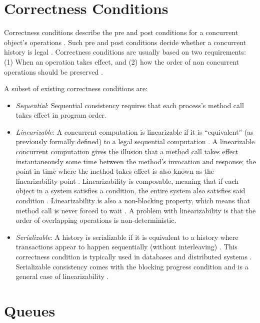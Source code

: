 \section{Correctness Conditions}

Correctness conditions describe the pre and post conditions for a concurrent object's operations \cite{herlihy2020art}. Such pre and post conditions decide whether a concurrent history is legal \cite{herlihy1990linearizability}. Correctness conditions are usually based on two requirements: (1) When an operation takes effect, and (2) how the order of non concurrent operations should be preserved \cite{herlihy1990linearizability}.

A subset of existing correctness conditions are:

\begin{itemize}
\item \emph{Sequential}: Sequential consistency requires that each process's method call takes effect in program order.
\item \emph{Linearizable}: A concurrent computation is linearizable if it is ``equivalent'' (as previously formally defined) to a legal sequential computation \cite{herlihy1990linearizability}. A linearizable concurrent computation gives the illusion that a method call takes effect instantaneously some time between the method's invocation and response; the point in time where the method takes effect is also known as the linearizability point \cite{herlihy2020art,herlihy1990linearizability}. Linearizability is composable, meaning that if each object in a system satisfies a condition, the entire system also satisfies said condition \cite[Chapter~3.3.1]{herlihy2020art}. Linearizability is also a non-blocking property, which means that method call is never forced to wait \cite{herlihy1990linearizability}. A problem with linearizability is that the order of overlapping operations is non-deterministic.
\item \emph{Serializable}: A history is serializable if it is equivalent to a history where transactions appear to happen sequentially (without interleaving) \cite[Section~3.3]{herlihy1990linearizability}. This correctness condition is typically used in databases and distributed systems \cite{guerraoui2019consensus}. Serializable consistency comes with the blocking progress condition and is a general case of linearizability \cite{herlihy1990linearizability}.
\end{itemize}

\section{Queues}
